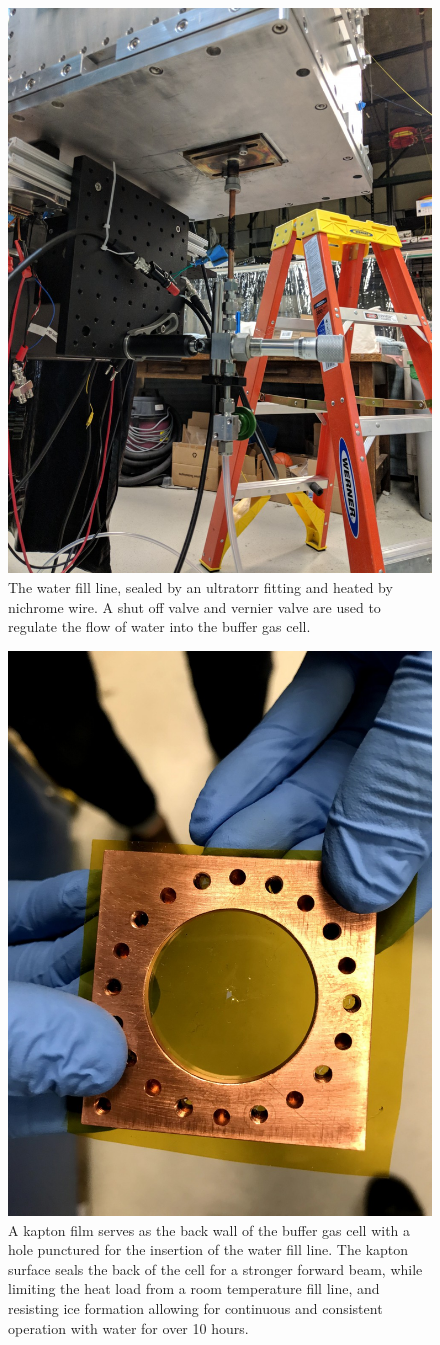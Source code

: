 \begin{figure}[H]
	\centering
	\includegraphics[width=.7\textwidth]{images/CBGB_water_fill_outside.jpg}
	\caption{The water fill line, sealed by an ultratorr fitting and heated by nichrome wire. A shut off valve and vernier valve are used to regulate the flow of water into the buffer gas cell.}
	\label{fig: water fill bottom}
\end{figure}

\begin{figure}[H]
	\centering
	\includegraphics[width=.7\textwidth]{images/CBGB_kapton.jpg}
	\caption{A kapton film serves as the back wall of the buffer gas cell with a hole punctured for the insertion of the water fill line. The kapton surface seals the back of the cell for a stronger forward beam, while limiting the heat load from a room temperature fill line, and resisting ice formation allowing for continuous and consistent operation with water for over 10 hours.}
	\label{fig: kapton film}
\end{figure}